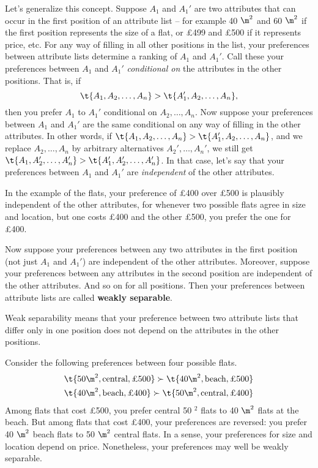 Let's generalize this concept. Suppose $A_1$ and $A_1'$ are two
attributes that can occur in the first position of an attribute list
-- for example 40 $\m^2$ and 60 $\m^2$ if the first position
represents the size of a flat, or £499 and £500 if it represents
price, etc. For any way of filling in all other
positions in the list, your preferences between attribute lists
determine a ranking of $A_1$ and $A_1'$. Call these your preferences
between $A_1$ and $A_1'$ \emph{conditional on} the attributes in the
other positions. That is, if
\[
   \t{A_1,A_2,\ldots,A_n} > \t{A_1',A_2,\ldots,A_n},
\]
then you prefer $A_1$ to $A_1'$ conditional on $A_2,\ldots,A_n$. Now suppose
your preferences between $A_1$ and $A_1'$ are the same conditional on any way of
filling in the other attributes. In other words, if
$\t{A_1,A_2,\ldots,A_n} > \t{A_1',A_2,\ldots,A_n}$, and we replace
$A_2,\ldots,A_n$ by arbitrary alternatives $A_2',\ldots,A_n'$, we still get
$\t{A_1,A_2',\ldots,A_n'} > \t{A_1',A_2',\ldots,A_n'}$. In that case, let's say
that your preferences between $A_1$ and $A_1'$ are \emph{independent} of the
other attributes.

In the example of the flats, your preference of £400 over £500 is plausibly
independent of the other attributes, for whenever two possible flats
agree in size and location, but one costs £400 and the other £500, you
prefer the one for £400.

Now suppose your preferences between any two attributes in the first
position (not just $A_1$ and $A_1'$) are independent of the other
attributes. Moreover, suppose your preferences between any attributes
in the second position are independent of the other attributes. And so
on for all positions. Then your preferences between attribute lists
are called \textbf{weakly separable}.

Weak separability means that your preference between two attribute lists that
differ only in one position does not depend on the attributes in the other
positions.

Consider the following preferences between four possible flats.
\begin{gather*}
\t{50 \m^2, \text{central}, \text{£500}} \succ \t{40 \m^2, \text{beach}, \text{£500}}\\
\t{40 \m^2, \text{beach}, \text{£400}} \succ \t{50 \m^2, \text{central}, \text{£400}}
\end{gather*}
Among flats that cost £500, you prefer central 50 \m$^2$ flats to 40
$\m^2$ flats at the beach. But among flats that cost £400, your
preferences are reversed: you prefer 40 $\m^2$ beach flats to 50
$\m^2$ central flats. In a sense, your preferences for size and
location depend on price. Nonetheless, your preferences may well be
weakly separable.


